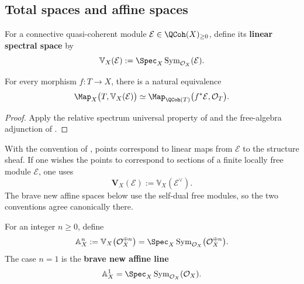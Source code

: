 \subsection{Total spaces and affine spaces}

\begin{definition}
\label{def:linear-spectral-space}
For a connective quasi-coherent module
$\mathcal E\in\QCoh(X)_{\geq0}$, define its \textbf{linear spectral
space} by
\[
    \mathbb V_X(\mathcal E)
    :=
    \Spec_X
    \operatorname{Sym}_{\mathcal O_X}(\mathcal E).
\]
\end{definition}

\begin{proposition}
\label{prop:linear-space-functor-points}
For every morphism $f:T\to X$, there is a natural equivalence
\[
    \Map_X
    \bigl(
        T,
        \mathbb V_X(\mathcal E)
    \bigr)
    \simeq
    \Map_{\QCoh(T)}
    \bigl(
        f^*\mathcal E,
        \mathcal O_T
    \bigr).
\]
\end{proposition}

\begin{proof}
Apply the relative spectrum universal property of
 and the free-algebra adjunction of
.
\end{proof}

\begin{remark}
\label{rem:vector-bundle-dual-convention}
With the convention of , points correspond
to linear maps from $\mathcal E$ to the structure sheaf. If one wishes the
points to correspond to sections of a finite locally free module
$\mathcal E$, one uses
\[
    \mathbf V_X(\mathcal E)
    :=
    \mathbb V_X(\mathcal E^\vee).
\]
The brave new affine spaces below use the self-dual free modules, so the
two conventions agree canonically there.
\end{remark}

\begin{definition}
\label{def:brave-new-affine-space}
For an integer $n\geq0$, define
\[
    \mathbb A_X^n
    :=
    \mathbb V_X
    \bigl(
        \mathcal O_X^{\oplus n}
    \bigr)
    =
    \Spec_X
    \operatorname{Sym}_{\mathcal O_X}
    \bigl(
        \mathcal O_X^{\oplus n}
    \bigr).
\]
The case $n=1$ is the \textbf{brave new affine line}
\[
    \mathbb A_X^1
    =
    \Spec_X
    \operatorname{Sym}_{\mathcal O_X}(\mathcal O_X).
\]
\end{definition}

